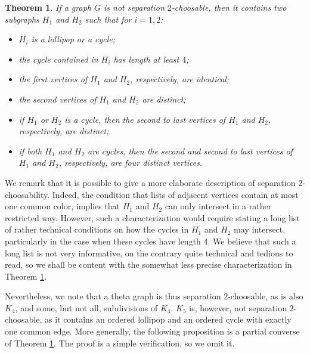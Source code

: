 \documentclass[12pt]{article}
\newtheorem{theorem}{Theorem}[section]
\begin{document}
\begin{theorem}
\label{th:2sepchoice}
	If a graph $G$ is not separation $2$-choosable, then it contains
	two subgraphs $H_1$ and $H_2$ such that for $i=1,2$:
\begin{itemize}
	\item[(i)] $H_i$ is a lollipop or a cycle;

	\item[(ii)] the cycle contained in $H_i$ has length at least $4$;

	\item[(iii)] the first vertices of $H_1$ and $H_2$, respectively, are identical;

	\item[(iv)] the second vertices of $H_1$ and $H_2$ are distinct;

	\item[(v)] if $H_1$ or $H_2$ is a cycle, then the second to last vertices of
	$H_1$ and $H_2$, respectively, are distinct;

	\item[(vi)] if both $H_1$ and $H_2$ are cycles, then the second 
	and second to last vertices of $H_1$ and $H_2$,
 	respectively, are four distinct vertices.


\end{itemize}
\end{theorem}
	We remark that it is possible to give a more elaborate description 
	of separation $2$-choosability.
	Indeed, the condition that lists of adjacent vertices contain 
	at most one common color, 
	implies that $H_1$ and $H_2$ can only intersect in a rather restricted way. However, such a
	characterization would require stating a long list of rather technical conditions on 
	how the cycles in $H_1$ and
	$H_2$ may intersect, particularly in the case when these cycles have length $4$. 
	We believe that
	such a long list is not very informative, on the contrary quite technical and tedious to
	read, so we shall be content with the somewhat less precise characterization in 
	Theorem \ref{th:2sepchoice}.
	
Nevertheless, we note that a theta graph is thus separation 
$2$-choosable, 
as is also $K_4$,
and some, but not all, subdivisions of $K_4$.
$K_5$ is, however, not separation $2$-choosable, as it contains 
       an ordered lollipop and
an ordered cycle with exactly one common edge.
More generally, the following proposition is a partial converse of Theorem 
        \ref{th:2sepchoice}. The proof is a simple verification, so we omit it.
\end{document}
